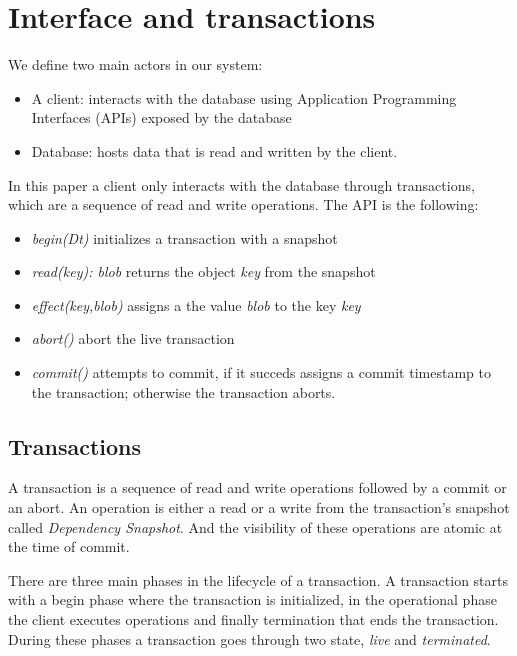 \documentclass[systeme,french,english]{compas2022}
\begin{document}
\section{Interface and transactions}

We define two main actors in our system:
\begin{itemize}
  \item A client: interacts with the database using Application Programming Interfaces (APIs) exposed by the database
  \item Database: hosts data that is read and written by the client.\\
\end{itemize}

In this paper a client only interacts with the database through transactions, which are a sequence of read and write operations.
The API is the following:
\begin{itemize}
  \item \emph{begin(Dt)} initializes a transaction with a snapshot
  \item \emph{read(key): blob} returns the object \emph{key} from the snapshot
  \item \emph{effect(key,blob)} assigns a the value \emph{blob} to the key \emph{key}
  \item \emph{abort()} abort the live transaction
  \item \emph{commit()} attempts to commit, if it succeds assigns a commit timestamp to the transaction; otherwise the transaction aborts.
\end{itemize}


\subsection{Transactions}

A transaction is a sequence of read and write operations followed by a commit or an abort.
An operation is either a read or a write from the transaction's snapshot called \emph{Dependency Snapshot}.
And the visibility of these operations are atomic at the time of commit.

There are three main phases in the lifecycle of a transaction.
A transaction starts with a begin phase where the transaction is initialized, in the operational phase the client executes operations and finally termination that ends the transaction.
During these phases a transaction goes through two state, \emph{live} and \emph{terminated}.
\end{document}
